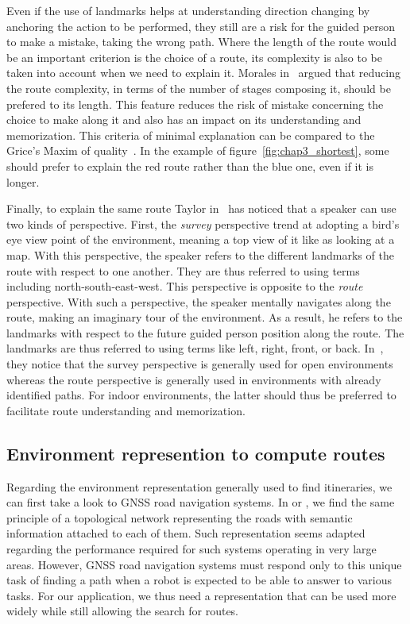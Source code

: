 Even if the use of landmarks helps at understanding direction changing by anchoring the action to be performed, they still are a risk for the guided person to make a mistake, taking the wrong path. Where the length of the route would be an important criterion is the choice of a route, its complexity is also to be taken into account when we need to explain it. Morales in~\cite{morales_2015_building} argued that reducing the route complexity, in terms of the number of stages composing it, should be prefered to its length. This feature reduces the risk of mistake concerning the choice to make along it and also has an impact on its understanding and memorization. This criteria of minimal explanation can be compared to the Grice's Maxim of quality~\cite{grice_1975_logic}. In the example of figure~\ref{fig:chap3_shortest}, some should prefer to explain the red route rather than the blue one, even if it is longer.

Finally, to explain the same route Taylor in~\cite{taylor_1992_spatial} has noticed that a speaker can use two kinds of perspective. First, the \textit{survey} perspective trend at adopting a bird's eye view point of the environment, meaning a top view of it like as looking at a map. With this perspective, the speaker refers to the different landmarks of the route with respect to one another. They are thus referred to using terms including north-south-east-west. This perspective is opposite to the \textit{route} perspective. With such a perspective, the speaker mentally navigates along the route, making an imaginary tour of the environment. As a result, he refers to the landmarks with respect to the future guided person position along the route. The landmarks are thus referred to using terms like left, right, front, or back. In~\cite{taylor_1996_perspective}, they notice that the survey perspective is generally used for open environments whereas the route perspective is generally used in environments with already identified paths. For indoor environments, the latter should thus be preferred to facilitate route understanding and memorization.

\subsection{Environment represention to compute routes}

Regarding the environment representation generally used to find itineraries, we can first take a look to GNSS road navigation systems. In \cite{liu_1997_route} or \cite{cao_2009_gps}, we find the same principle of a topological network representing the roads with semantic information attached to each of them. Such representation seems adapted regarding the performance required for such systems operating in very large areas. However, GNSS road navigation systems must respond only to this unique task of finding a path when a robot is expected to be able to answer to various tasks. For our application, we thus need a representation that can be used more widely while still allowing the search for routes.

